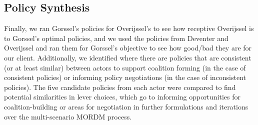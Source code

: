 \subsection{Policy Synthesis}
Finally, we ran Gorssel's policies for Overijssel's to see how receptive Overijssel is to Gorssel's optimal policies, and we used the policies from Deventer and Overijssel and ran them for Gorssel's objective to see how good/bad they are for our client. 
Additionally, we identified where there are policies that are consistent (or at least similar) between actors to support coalition forming (in the case of consistent policies) or informing policy negotiations (in the case of inconsistent policies). The five candidate policies from each actor were compared to find potential similarities in lever choices, which go to informing opportunities for coalition-building or areas for negotiation in further formulations and iterations over the multi-scenario MORDM process.



